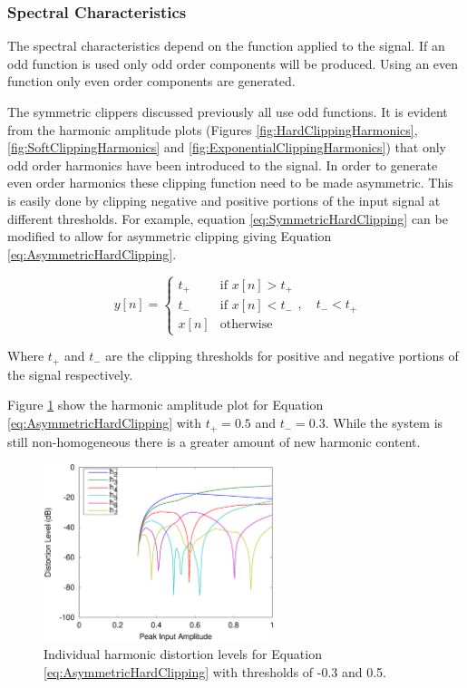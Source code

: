 		\subsubsection*{Spectral Characteristics}
			The spectral characteristics depend on the function applied to the signal. If an odd function is
			used only odd order components will be produced. Using an even function only even order components
			are generated. 

			The symmetric clippers discussed previously all use odd functions. It is evident from the harmonic
			amplitude plots (Figures \ref{fig:HardClippingHarmonics}, \ref{fig:SoftClippingHarmonics} and
			\ref{fig:ExponentialClippingHarmonics}) that only odd order harmonics have been introduced to the
			signal. In order to generate even order harmonics these clipping function need to be made
			asymmetric. This is easily done by clipping negative and positive portions of the input signal at
			different thresholds. For example, equation \ref{eq:SymmetricHardClipping} can be modified to allow
			for asymmetric clipping giving Equation \ref{eq:AsymmetricHardClipping}.
			
			\begin{equation}
				y[n] = \begin{cases}
					t_{+} & \text{if $x[n] > t_{+}$} \\
					t_{-} & \text{if $x[n] < t_{-}$} \\
					x[n] & \text{otherwise}
				\end{cases}, \quad t_{-} < t_{+}
				\label{eq:AsymmetricHardClipping}
			\end{equation}

			Where $t_{+}$ and $t_{-}$ are the clipping thresholds for positive and negative portions of the
			signal respectively.	

			Figure \ref{fig:AsymmetricHardClippingHarmonics} show the harmonic amplitude plot for Equation
			\ref{eq:AsymmetricHardClipping} with $t_{+} = 0.5$ and $t_{-} = 0.3$. While the system is still
			non-homogeneous there is a greater amount of new harmonic content.

			\begin{figure}[h!]
				\centering
				\includegraphics[width=0.6\textwidth]{chapter3/Images/AsymmetricHardClippingHarmonics.eps}
				\caption{Individual harmonic distortion levels for Equation
					 \ref{eq:AsymmetricHardClipping} with thresholds of -0.3 and 0.5.}
				\label{fig:AsymmetricHardClippingHarmonics}
			\end{figure}

